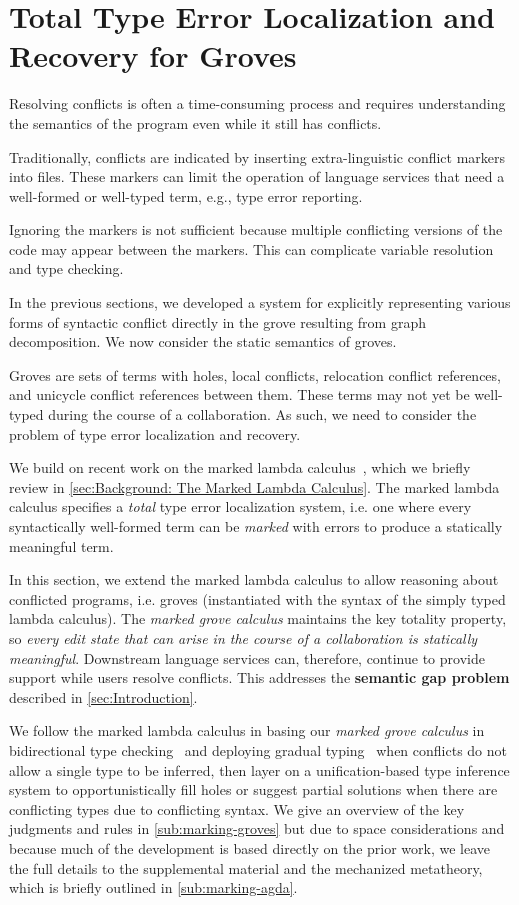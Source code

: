 
\section{Total Type Error Localization and Recovery for Groves}%
\label{sec:Marking System}

Resolving conflicts is often a time-consuming process 
and requires understanding the semantics of the program
even while it still has conflicts.

Traditionally, conflicts are indicated by inserting extra-linguistic conflict markers into files. 
These markers can limit the operation of language services that need a well-formed or well-typed term, 
e.g., type error reporting. 

Ignoring the markers is not sufficient because 
multiple conflicting versions of the code may appear
between the markers. This can complicate variable resolution and type checking.

In the previous sections, we developed a system for explicitly representing various forms of syntactic conflict directly in the grove resulting from graph decomposition. We now consider the static semantics of 
groves.

Groves are sets of terms with holes, local conflicts, relocation conflict references, and unicycle conflict references between them. These terms may not yet be well-typed during the course of a collaboration. 
As such, we need to consider the problem of type error localization and recovery. 

We build on recent work on the marked lambda calculus~\cite{DBLP:journals/pacmpl/ZhaoMDBPO24}, which we briefly review in \autoref{sec:Background: The Marked Lambda Calculus}. 
The marked lambda calculus specifies a \emph{total} 
type error localization system, i.e. one where every syntactically well-formed term can be \emph{marked} with errors to produce a statically meaningful term.

In this section, we extend the marked lambda calculus to allow reasoning about conflicted programs, i.e. groves (instantiated with the syntax of the simply typed lambda calculus). 
The \emph{marked grove calculus} maintains the key totality property, so \emph{every edit state that can arise in the course of a collaboration is statically meaningful}. Downstream language services can, therefore, continue to provide support while users resolve conflicts. This addresses the \textbf{semantic gap problem} described in \autoref{sec:Introduction}.

We follow the marked lambda calculus in basing our \emph{marked grove calculus} in bidirectional type checking~\cite{dunfield2019} and deploying gradual typing~\cite{siek2015} when conflicts do not allow a single type to be inferred, then layer on a unification-based type inference system to opportunistically fill holes or suggest partial solutions when there are conflicting types due to conflicting syntax. We give an overview of the key judgments and rules in \autoref{sub:marking-groves} but due to space considerations and because much of the development is based directly on the prior work, we leave the full details to the supplemental material and the mechanized metatheory, which is briefly outlined in \ref{sub:marking-agda}.


